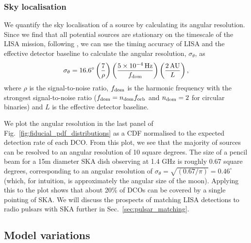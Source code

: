 \subsubsection{Sky localisation}
We quantify the sky localisation of a source by calculating its angular resolution. Since we find that all potential sources are stationary on the timescale of the LISA mission, following \citet{Mandel+2018}, we can use the timing accuracy of LISA and the effective detector baseline to calculate the angular resolution, $\sigma_{\theta}$, as
\begin{equation}
    \sigma_{\theta} = 16.6^\circ \left(\frac{7}{\rho}\right) \left(\frac{5 \times 10^{-4} \unit{Hz}}{f_{\rm dom}}\right) \left( \frac{2 \unit{AU}}{L} \right),
\end{equation}
where $\rho$ is the signal-to-noise ratio, $f_{\rm dom}$ is the harmonic frequency with the strongest signal-to-noise ratio ($f_{\rm dom} = n_{\rm dom} f_{\rm orb}$ and $n_{\rm dom} = 2$ for circular binaries) and $L$ is the effective detector baseline.

We plot the angular resolution in the last panel of Fig.~\ref{fig:fiducial_pdf_distributions} as a CDF normalised to the expected detection rate of each DCO. From this plot, we see that the majority of sources can be resolved to an angular resolution of 10 square degrees. The size of a pencil beam for a 15m diameter SKA dish observing at 1.4 GHz is roughly 0.67 square degrees, corresponding to an angular resolution of $\sigma_\theta = \sqrt{(0.67 / \pi)} = 0.46^\circ$ (which, for intuition, is approximately the angular size of the moon). Applying this to the plot shows that about 20\% of DCOs can be covered by a single pointing of SKA. We will discuss the prospects of matching LISA detections to radio pulsars with SKA further in Sec.~\ref{sec:pulsar_matching}.

\subsection{Model variations}
